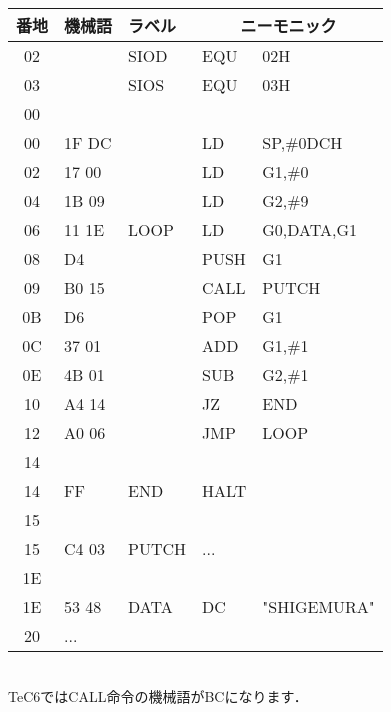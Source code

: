 \begin{center}
{{\begin{description}
\begin{center}
{\footnotesize\tt
\begin{tabular}{|c|l|l|l l|} \hline
番地 & 機械語 & ラベル & \multicolumn{2}{|c|}{ニーモニック} \\
\hline
02 &       & SIOD  & EQU  & 02H             \\
03 &       & SIOS  & EQU  & 03H             \\
00 &       &       &      &                 \\
00 & 1F DC &       & LD   & SP,\#0DCH       \\
02 & 17 00 &       & LD   & G1,\#0          \\
04 & 1B 09 &       & LD   & G2,\#9          \\
06 & 11 1E & LOOP  & LD   & G0,DATA,G1      \\
08 & D4    &       & PUSH & G1              \\
09 & B0 15 &       & CALL & PUTCH           \\
0B & D6    &       & POP  & G1              \\
0C & 37 01 &       & ADD  & G1,\#1          \\
0E & 4B 01 &       & SUB  & G2,\#1          \\
10 & A4 14 &       & JZ   & END             \\
12 & A0 06 &       & JMP  & LOOP            \\
14 &       &       &      &                 \\
14 & FF    & END   & HALT &                 \\
15 &       &       &      &                 \\
15 & C4 03 & PUTCH & ...  &                 \\
1E &       &       &      &                 \\
1E & 53 48 & DATA  & DC   & "SHIGEMURA"     \\
20 & ...   &       &      &                 \\
\hline
\end{tabular}
\\TeC6ではCALL命令の機械語がBCになります．
}
\end{center}
\end{description}
}}
\end{center}

